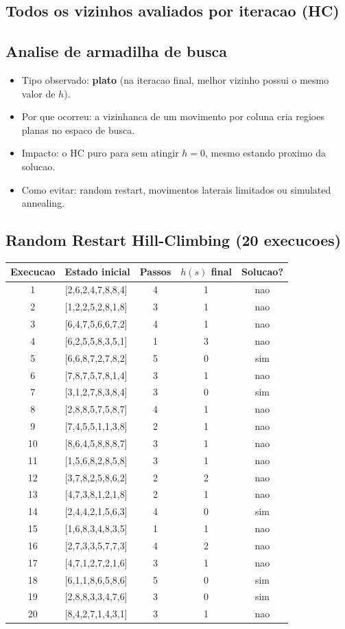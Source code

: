 \subsection{Todos os vizinhos avaliados por iteracao (HC)}


\subsection{Analise de armadilha de busca}
\begin{itemize}[leftmargin=1.5em]
  \item Tipo observado: \textbf{plato} (na iteracao final, melhor vizinho possui o mesmo valor de $h$).
  \item Por que ocorreu: a vizinhanca de um movimento por coluna cria regioes planas no espaco de busca.
  \item Impacto: o HC puro para sem atingir $h=0$, mesmo estando proximo da solucao.
  \item Como evitar: random restart, movimentos laterais limitados ou simulated annealing.
\end{itemize}

\subsection{Random Restart Hill-Climbing (20 execucoes)}
\begingroup
\scriptsize
\begin{longtable}{c p{3.5cm} c c c}
\toprule
Execucao & Estado inicial & Passos & $h(s)$ final & Solucao? \\
\midrule
1 & [2,6,2,4,7,8,8,4] & 4 & 1 & nao \\
2 & [1,2,2,5,2,8,1,8] & 3 & 1 & nao \\
3 & [6,4,7,5,6,6,7,2] & 4 & 1 & nao \\
4 & [6,2,5,5,8,3,5,1] & 1 & 3 & nao \\
5 & [6,6,8,7,2,7,8,2] & 5 & 0 & sim \\
6 & [7,8,7,5,7,8,1,4] & 3 & 1 & nao \\
7 & [3,1,2,7,8,3,8,4] & 3 & 0 & sim \\
8 & [2,8,8,5,7,5,8,7] & 4 & 1 & nao \\
9 & [7,4,5,5,1,1,3,8] & 2 & 1 & nao \\
10 & [8,6,4,5,8,8,8,7] & 3 & 1 & nao \\
11 & [1,5,6,8,2,8,5,8] & 3 & 1 & nao \\
12 & [3,7,8,2,5,8,6,2] & 2 & 2 & nao \\
13 & [4,7,3,8,1,2,1,8] & 2 & 1 & nao \\
14 & [2,4,4,2,1,5,6,3] & 4 & 0 & sim \\
15 & [1,6,8,3,4,8,3,5] & 1 & 1 & nao \\
16 & [2,7,3,3,5,7,7,3] & 4 & 2 & nao \\
17 & [4,7,1,2,7,2,1,6] & 3 & 1 & nao \\
18 & [6,1,1,8,6,5,8,6] & 5 & 0 & sim \\
19 & [2,8,8,3,3,4,7,6] & 3 & 0 & sim \\
20 & [8,4,2,7,1,4,3,1] & 3 & 1 & nao \\
\bottomrule
\end{longtable}
\endgroup

